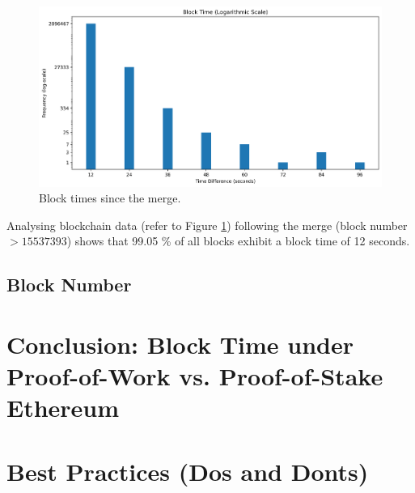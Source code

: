 
\begin{figure}[H]
  \centering
  \includegraphics[width=1\textwidth]{../block_time_analysis/time_difference_bar.png}
  \caption{Block times since the merge.}
  \label{fig:block_time_analysis}
\end{figure}

Analysing blockchain data (refer to Figure \ref{fig:block_time_analysis}) following the
merge (block number $> 15537393$) shows that 99.05 \% of all blocks exhibit a
block time of 12 seconds.

\subsection{Block Number}


\section{Conclusion: Block Time under Proof-of-Work vs. Proof-of-Stake Ethereum}
\section{Best Practices (Dos and Donts)}

